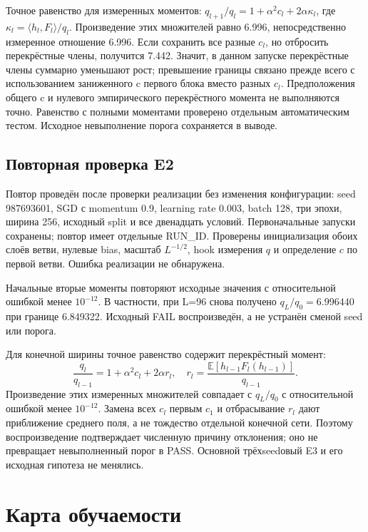 Точное равенство для измеренных моментов: $q_{l+1}/q_l=1+\alpha^2c_l+2\alpha\kappa_l$, где $\kappa_l=\langle h_l,F_l\rangle/q_l$. Произведение этих множителей равно 6.996, непосредственно измеренное отношение 6.996. Если сохранить все разные $c_l$, но отбросить перекрёстные члены, получится 7.442. Значит, в данном запуске перекрёстные члены суммарно уменьшают рост; превышение границы связано прежде всего с использованием заниженного c первого блока вместо разных $c_l$. Предположения общего c и нулевого эмпирического перекрёстного момента не выполняются точно. Равенство с полными моментами проверено отдельным автоматическим тестом. Исходное невыполнение порога сохраняется в выводе.


\subsection*{Повторная проверка E2}
Повтор проведён после проверки реализации без изменения конфигурации: seed 987693601, SGD с momentum 0.9, learning rate 0.003, batch 128, три эпохи, ширина 256, исходный split и все двенадцать условий. Первоначальные запуски сохранены; повтор имеет отдельные RUN\_ID. Проверены инициализация обоих слоёв ветви, нулевые bias, масштаб $L^{-1/2}$, hook измерения $q$ и определение $c$ по первой ветви. Ошибка реализации не обнаружена.




Начальные вторые моменты повторяют исходные значения с относительной ошибкой менее $10^{-12}$. В частности, при L=96 снова получено $q_L/q_0=6.996440$ при границе 6.849322. Исходный FAIL воспроизведён, а не устранён сменой seed или порога.

Для конечной ширины точное равенство содержит перекрёстный момент:
\begin{equation}
\frac{q_l}{q_{l-1}}=1+\alpha^2 c_l+2\alpha r_l,\quad
r_l=\frac{\mathbb E[h_{l-1}F_l(h_{l-1})]}{q_{l-1}}.
\end{equation}
Произведение этих измеренных множителей совпадает с $q_L/q_0$ с относительной ошибкой менее $10^{-12}$. Замена всех $c_l$ первым $c_1$ и отбрасывание $r_l$ дают приближение среднего поля, а не тождество отдельной конечной сети. Поэтому воспроизведение подтверждает численную причину отклонения; оно не превращает невыполненный порог в PASS. Основной трёхseedовый E3 и его исходная гипотеза не менялись.

\section{Карта обучаемости}

